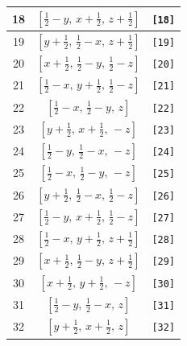 \documentclass[fleqn,8pt]{jsarticle}
\begin{document}
\begin{longtable}{ccc}
18 & $\left[ \frac{1}{2} - y,\, x + \frac{1}{2},\, z + \frac{1}{2} \right]$ & {\tt [18]} \\ \hline
19 & $\left[ y + \frac{1}{2},\, \frac{1}{2} - x,\, z + \frac{1}{2} \right]$ & {\tt [19]} \\ \hline
20 & $\left[ x + \frac{1}{2},\, \frac{1}{2} - y,\, \frac{1}{2} - z \right]$ & {\tt [20]} \\ \hline
21 & $\left[ \frac{1}{2} - x,\, y + \frac{1}{2},\, \frac{1}{2} - z \right]$ & {\tt [21]} \\ \hline
22 & $\left[ \frac{1}{2} - x,\, \frac{1}{2} - y,\, z \right]$ & {\tt [22]} \\ \hline
23 & $\left[ y + \frac{1}{2},\, x + \frac{1}{2},\, - z \right]$ & {\tt [23]} \\ \hline
24 & $\left[ \frac{1}{2} - y,\, \frac{1}{2} - x,\, - z \right]$ & {\tt [24]} \\ \hline
25 & $\left[ \frac{1}{2} - x,\, \frac{1}{2} - y,\, - z \right]$ & {\tt [25]} \\ \hline
26 & $\left[ y + \frac{1}{2},\, \frac{1}{2} - x,\, \frac{1}{2} - z \right]$ & {\tt [26]} \\ \hline
27 & $\left[ \frac{1}{2} - y,\, x + \frac{1}{2},\, \frac{1}{2} - z \right]$ & {\tt [27]} \\ \hline
28 & $\left[ \frac{1}{2} - x,\, y + \frac{1}{2},\, z + \frac{1}{2} \right]$ & {\tt [28]} \\ \hline
29 & $\left[ x + \frac{1}{2},\, \frac{1}{2} - y,\, z + \frac{1}{2} \right]$ & {\tt [29]} \\ \hline
30 & $\left[ x + \frac{1}{2},\, y + \frac{1}{2},\, - z \right]$ & {\tt [30]} \\ \hline
31 & $\left[ \frac{1}{2} - y,\, \frac{1}{2} - x,\, z \right]$ & {\tt [31]} \\ \hline
32 & $\left[ y + \frac{1}{2},\, x + \frac{1}{2},\, z \right]$ & {\tt [32]} \\
\end{longtable}
\end{document}
